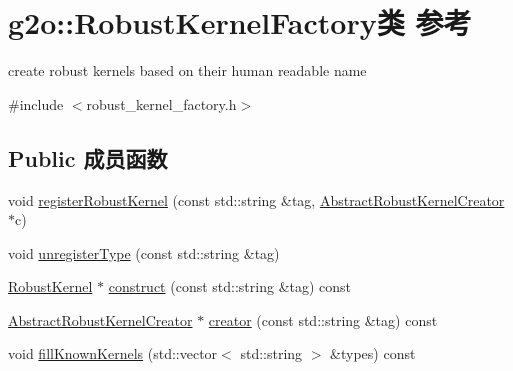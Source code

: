 \hypertarget{classg2o_1_1RobustKernelFactory}{\section{g2o\-:\-:Robust\-Kernel\-Factory类 参考}
\label{classg2o_1_1RobustKernelFactory}
}


create robust kernels based on their human readable name  




{\ttfamily \#include $<$robust\-\_\-kernel\-\_\-factory.\-h$>$}

\subsection*{Public 成员函数}
\begin{DoxyCompactItemize}
\item 
void \hyperlink{classg2o_1_1RobustKernelFactory_a71de3f228b58ae4a2dd965cc2cd8ff95}{register\-Robust\-Kernel} (const std\-::string \&tag, \hyperlink{classg2o_1_1AbstractRobustKernelCreator}{Abstract\-Robust\-Kernel\-Creator} $\ast$c)
\item 
void \hyperlink{classg2o_1_1RobustKernelFactory_af3b0dac653627b5f87c68d4180b87475}{unregister\-Type} (const std\-::string \&tag)
\item 
\hyperlink{classg2o_1_1RobustKernel}{Robust\-Kernel} $\ast$ \hyperlink{classg2o_1_1RobustKernelFactory_a59a1221d3b434f116291ee3b2f810ccf}{construct} (const std\-::string \&tag) const 
\item 
\hyperlink{classg2o_1_1AbstractRobustKernelCreator}{Abstract\-Robust\-Kernel\-Creator} $\ast$ \hyperlink{classg2o_1_1RobustKernelFactory_ad98d044ff87a05c7ab2a62bb18af0417}{creator} (const std\-::string \&tag) const 
\item 
void \hyperlink{classg2o_1_1RobustKernelFactory_a31dd636c46847a9099a2c55f77f1b4bc}{fill\-Known\-Kernels} (std\-::vector$<$ std\-::string $>$ \&types) const 
\end{DoxyCompactItemize}
